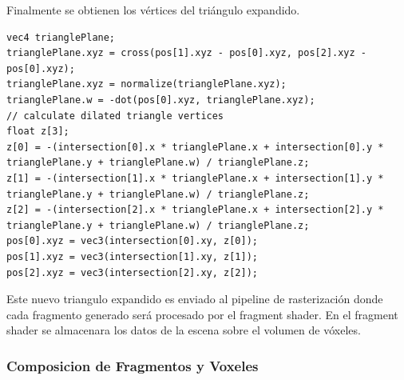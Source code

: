 Finalmente se obtienen los vértices del triángulo expandido.
\\
\begin{lstlisting}[caption={Vértices del triángulo expandido.}, label=TPlanes3]
vec4 trianglePlane;
trianglePlane.xyz = cross(pos[1].xyz - pos[0].xyz, pos[2].xyz - pos[0].xyz);
trianglePlane.xyz = normalize(trianglePlane.xyz);
trianglePlane.w = -dot(pos[0].xyz, trianglePlane.xyz);
// calculate dilated triangle vertices
float z[3];
z[0] = -(intersection[0].x * trianglePlane.x + intersection[0].y * trianglePlane.y + trianglePlane.w) / trianglePlane.z;
z[1] = -(intersection[1].x * trianglePlane.x + intersection[1].y * trianglePlane.y + trianglePlane.w) / trianglePlane.z;
z[2] = -(intersection[2].x * trianglePlane.x + intersection[2].y * trianglePlane.y + trianglePlane.w) / trianglePlane.z;
pos[0].xyz = vec3(intersection[0].xy, z[0]);
pos[1].xyz = vec3(intersection[1].xy, z[1]);
pos[2].xyz = vec3(intersection[2].xy, z[2]);
\end{lstlisting}

Este nuevo triangulo expandido es enviado al pipeline de rasterización donde cada fragmento generado será procesado por el fragment shader. En el fragment shader se almacenara los datos de la escena sobre el volumen de vóxeles.

\subsubsection{Composicion de Fragmentos y Voxeles}



